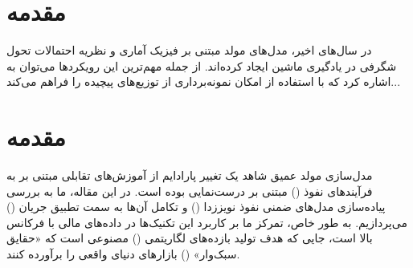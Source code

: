 \begin{abstract}
این گزارش به ارائه پیاده‌سازی کامل و تحلیل عمیق دو خانواده مدرن از مدل‌های مولد اعمال شده بر روی مجموعه داده ارقام دست‌نویس  می‌پردازد: مدل‌های انرژی‌محور () که با واگرایی مقابله‌ای () و دینامیک لانژون آموزش دیده‌اند، و شبکه‌های امتیاز شرطی نویزی () که با تطبیق امتیاز نویززدایی وزن‌دار () آموزش یافته و با استفاده از دینامیک لانژون بازپخت‌شده () نمونه‌برداری شده‌اند. ما در این پژوهش دقیقاً مطابق با مشخصات  عمل کرده، مشتقات ریاضی دقیق برای تمامی توابع هدف را ارائه داده و معماری‌ها و خط‌لوله‌های آموزش را تشریح می‌کنیم. همچنین نتایج تجربی برای تولید بدون شرط ()، تولید شرطی () و نویززدایی در سطوح مختلف نویز مستند شده است. این گزارش به گونه‌ای جامع تنظیم شده است تا به عنوان یک مرجع مستقل شامل مبانی نظری، جزئیات پیاده‌سازی، تحلیل‌های فرسایشی () و بحثی ساختاریافته پیرامون محدودیت‌ها عمل کند. تمامی تصاویر با زیرنویس‌های دقیق و مسیرهای فایل مرتبط ارجاع داده شده‌اند تا ردیابی بین خروجی‌های کد و تحلیل‌های مکتوب تضمین شود. آزمایش‌های ما نشان‌دهنده انعطاف‌پذیری ها در نمونه‌برداری و کیفیت برتر ها در تولید و نویززدایی است.
\end{abstract}


\newpage



\tableofcontents %





\newpage


\section{مقدمه}
در سال‌های اخیر، مدل‌های مولد مبتنی بر فیزیک آماری و نظریه احتمالات تحول شگرفی در یادگیری ماشین ایجاد کرده‌اند. از جمله مهم‌ترین این رویکردها می‌توان به  اشاره کرد که با استفاده از  امکان نمونه‌برداری از توزیع‌های پیچیده را فراهم می‌کند...



\section{مقدمه}
مدل‌سازی مولد عمیق شاهد یک تغییر پارادایم از آموزش‌های تقابلی مبتنی بر  به فرآیندهای نفوذ () مبتنی بر درست‌نمایی بوده است. در این مقاله، ما به بررسی پیاده‌سازی مدل‌های ضمنی نفوذ نویززدا () و تکامل آن‌ها به سمت تطبیق جریان () می‌پردازیم. به طور خاص، تمرکز ما بر کاربرد این تکنیک‌ها در داده‌های مالی با فرکانس بالا است، جایی که هدف تولید بازده‌های لگاریتمی () مصنوعی است که «حقایق سبک‌وار» () بازارهای دنیای واقعی را برآورده کنند.

